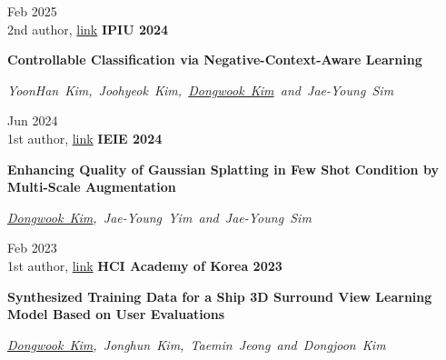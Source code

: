 \documentclass[10pt, letterpaper]{article}
\newenvironment{twocolentry_paper}[2][]{
    \onecolentry
    \def\secondColumn{#2}
    \setcolumnwidth{\fill, 3.1 cm}
    \begin{paracol}{2}
}{
    \switchcolumn \raggedleft \secondColumn
    \end{paracol}
    \endonecolentry
} %
\let\hrefWithoutArrow\href
\renewcommand{\href}[2]{\hrefWithoutArrow{#1}{\ifthenelse{\equal{#2}{}}{ }{#2 }\raisebox{.15ex}{\footnotesize \faExternalLink*}}}
\begin{document}
        \begin{twocolentry_paper}{
            Feb 2025
            \\2nd author, \hrefWithoutArrow{http://www.ipiu.or.kr/images/mtl01r-20-0043/sub/IPIU2025_Program_v3.pdf}{\faLink link}
            }
            \textbf{\color{headingOrange}IPIU 2024}

            \textbf{Controllable Classification via Negative-Context-Aware Learning}

            \mbox{\textit{YoonHan Kim,
            Joohyeok Kim, \underline{Dongwook Kim} and Jae-Young Sim}}
            \vspace{0.10 cm}
            
        \end{twocolentry_paper}


        \begin{twocolentry_paper}{
            Jun 2024
            \\1st author, \hrefWithoutArrow{https://www.dbpia.co.kr/pdf/pdfView.do?nodeId=NODE11890955&width=1732}{\faLink link} 
            }
            \textbf{\color{headingOrange}IEIE 2024}

            \textbf{Enhancing Quality of Gaussian Splatting in Few Shot Condition by Multi-Scale Augmentation}
    
            \mbox{\textit{\underline{Dongwook Kim}, Jae-Young Yim and Jae-Young Sim}}
            
        
            \vspace{0.10 cm}
            
        \end{twocolentry_paper}


        \begin{twocolentry_paper}{
            Feb 2023 \\
            1st author, \hrefWithoutArrow{https://www.dbpia.co.kr/pdf/pdfView.do?nodeId=NODE11229776&width=1732}{\faLink link}
            }
            \textbf{\color{headingOrange}HCI Academy of Korea 2023}

            \textbf{Synthesized Training Data for a Ship 3D Surround View Learning Model Based on User Evaluations}
            
            \mbox{\textit{\underline{Dongwook Kim}, Jonghun Kim, Taemin Jeong and Dongjoon Kim}}
            
        
            \vspace{0.10 cm}
            
        \end{twocolentry_paper}
\end{document}
